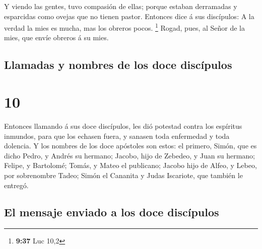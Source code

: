  Y viendo las gentes, tuvo compasión de ellas; porque
estaban derramadas y esparcidas como ovejas que no tienen pastor.
 Entonces dice á sus discípulos: A la verdad la mies es
mucha, mas los obreros pocos. \footnote{\textbf{9:37} Luc 10,2}
 Rogad, pues, al Señor de la mies, que envíe obreros á su
mies.

\hypertarget{llamadas-y-nombres-de-los-doce-discuxedpulos}{%
\subsection{Llamadas y nombres de los doce
discípulos}\label{llamadas-y-nombres-de-los-doce-discuxedpulos}}

\hypertarget{section-9}{%
\section{10}\label{section-9}}

 Entonces llamando á sus doce discípulos, les dió potestad
contra los espíritus inmundos, para que los echasen fuera, y sanasen
toda enfermedad y toda dolencia.  Y los nombres de los
doce apóstoles son estos: el primero, Simón, que es dicho Pedro, y
Andrés su hermano; Jacobo, hijo de Zebedeo, y Juan su hermano;
 Felipe, y Bartolomé; Tomás, y Mateo el publicano; Jacobo
hijo de Alfeo, y Lebeo, por sobrenombre Tadeo;  Simón el
Cananita y Judas Iscariote, que también le entregó.

\hypertarget{el-mensaje-enviado-a-los-doce-discuxedpulos}{%
\subsection{El mensaje enviado a los doce
discípulos}\label{el-mensaje-enviado-a-los-doce-discuxedpulos}}

